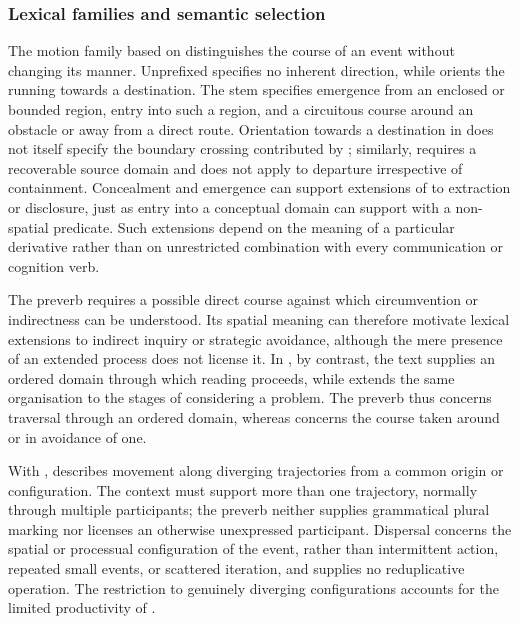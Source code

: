 \subsubsection{Lexical families and semantic selection}

The motion family based on   distinguishes the course
of an event without changing its manner. Unprefixed  specifies
no inherent direction, while  orients the running towards a
destination. The stem  specifies emergence from an enclosed or
bounded region,  entry into such a region, and  a
circuitous course around an obstacle or away from a direct route. Orientation
towards a destination in  does not itself specify the boundary
crossing contributed by ; similarly,  requires a
recoverable source domain and does not apply to departure irrespective of
containment. Concealment and emergence can support extensions of 
to extraction or disclosure, just as entry into a conceptual domain can support
 with a non-spatial predicate. Such extensions depend on the meaning
of a particular derivative rather than on unrestricted combination with every
communication or cognition verb.

The preverb  requires a possible direct course against which
circumvention or indirectness can be understood. Its spatial meaning can therefore motivate
lexical extensions to indirect inquiry or strategic avoidance, although the
mere presence of an extended process does not license it. In
, by contrast, the text supplies an ordered domain through
which reading proceeds, while  extends the same organisation
to the stages of considering a problem. The preverb  thus
concerns traversal through an ordered domain, whereas  concerns the course taken
around or in avoidance of one.

With  ,  describes
movement along diverging trajectories from a common origin or configuration.
The context must support more than one trajectory, normally through multiple
participants; the preverb neither supplies grammatical plural marking nor
licenses an otherwise unexpressed participant. Dispersal concerns the spatial
or processual configuration of the event, rather than intermittent action,
repeated small events, or scattered iteration, and supplies no reduplicative
operation. The restriction to genuinely diverging configurations accounts for the limited
productivity of .

